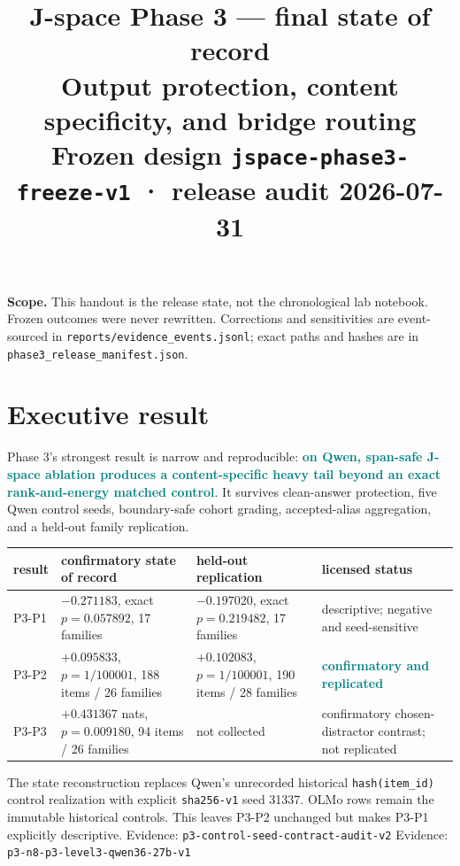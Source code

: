 \documentclass[10pt]{article}
\title{\vspace{-1.3em}J-space Phase 3 --- final state of record\\
\large Output protection, content specificity, and bridge routing\\[3pt]
\normalsize\textcolor{muted}{Frozen design
\texttt{jspace-phase3-freeze-v1} · release audit 2026-07-31}}
\author{}\date{}
\newcommand{\eid}[1]{\newline\textcolor{muted}{\footnotesize
Evidence: \nolinkurl{#1}}}
\newcommand{\good}[1]{\textcolor{teal}{\textbf{#1}}}
\begin{document}
\maketitle
\vspace{-2.8em}

\noindent\textbf{Scope.} This handout is the release state, not the
chronological lab notebook. Frozen outcomes were never rewritten.
Corrections and sensitivities are event-sourced in
\texttt{reports/evidence\_events.jsonl}; exact paths and hashes are in
\texttt{phase3\_release\_manifest.json}.

\section{Executive result}

Phase 3's strongest result is narrow and reproducible:
\good{on Qwen, span-safe J-space ablation produces a content-specific
heavy tail beyond an exact rank-and-energy matched control}. It survives
clean-answer protection, five Qwen control seeds, boundary-safe cohort
grading, accepted-alias aggregation, and a held-out family replication.

\begin{center}\small
\renewcommand{\arraystretch}{1.16}
\begin{tabular}{L{2.15cm}L{4.0cm}L{4.0cm}L{3.1cm}}
\toprule
result & confirmatory state of record & held-out replication & licensed status\\
\midrule
P3-P1 &
$-0.271183$, exact $p=0.057892$,
17 families &
$-0.197020$, exact $p=0.219482$,
17 families &
descriptive; negative and seed-sensitive\\
P3-P2 &
$+0.095833$, $p=1/100001$,
188 items / 26 families &
$+0.102083$, $p=1/100001$,
190 items / 28 families &
\good{confirmatory and replicated}\\
P3-P3 &
$+0.431367$ nats, $p=0.009180$,
94 items / 26 families &
not collected &
confirmatory chosen-distractor contrast; not replicated\\
\bottomrule
\end{tabular}
\end{center}

The state reconstruction replaces Qwen's unrecorded historical
\texttt{hash(item\_id)} control realization with explicit
\texttt{sha256-v1} seed 31337. OLMo rows remain the immutable historical
controls. This leaves P3-P2 unchanged but makes P3-P1 explicitly
descriptive. \eid{p3-control-seed-contract-audit-v2}
\eid{p3-n8-p3-level3-qwen36-27b-v1}
\end{document}
